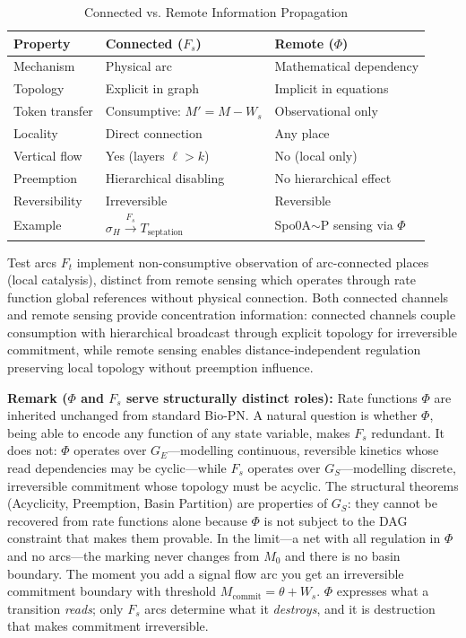 \documentclass[10pt,letterpaper]{article}
\begin{document}
\begin{table}[h]
\centering
\footnotesize
\caption{Connected vs. Remote Information Propagation}
\label{tab:connected_remote}
\begin{tabular}{p{2.2cm}p{3.9cm}p{3.9cm}}
\toprule
\textbf{Property} & \textbf{Connected ($F_s$)} & \textbf{Remote ($\Phi$)} \\
\midrule
Mechanism & Physical arc & Mathematical dependency \\
Topology & Explicit in graph & Implicit in equations \\
Token transfer & Consumptive: $M' = M - W_s$ & Observational only \\
Locality & Direct connection & Any place \\
Vertical flow & Yes (layers $\ell > k$) & No (local only) \\
Preemption & Hierarchical disabling & No hierarchical effect \\
Reversibility & Irreversible & Reversible \\
Example & $\sigma_H \xrightarrow{F_s} T_{\text{septation}}$ & Spo0A$\sim$P sensing via $\Phi$ \\
\bottomrule
\end{tabular}
\end{table}

Test arcs $F_t$ implement non-consumptive observation of arc-connected places (local catalysis), distinct from remote sensing which operates through rate function global references without physical connection. Both connected channels and remote sensing provide concentration information: connected channels couple consumption with hierarchical broadcast through explicit topology for irreversible commitment, while remote sensing enables distance-independent regulation preserving local topology without preemption influence.

\textbf{Remark ($\Phi$ and $F_s$ serve structurally distinct roles):} Rate functions $\Phi$ are inherited unchanged from standard Bio-PN. A natural question is whether $\Phi$, being able to encode any function of any state variable, makes $F_s$ redundant. It does not: $\Phi$ operates over $G_E$---modelling continuous, reversible kinetics whose read dependencies may be cyclic---while $F_s$ operates over $G_S$---modelling discrete, irreversible commitment whose topology must be acyclic. The structural theorems (Acyclicity, Preemption, Basin Partition) are properties of $G_S$: they cannot be recovered from rate functions alone because $\Phi$ is not subject to the DAG constraint that makes them provable. In the limit---a net with all regulation in $\Phi$ and no arcs---the marking never changes from $M_0$ and there is no basin boundary. The moment you add a signal flow arc you get an irreversible commitment boundary with threshold $M_{\text{commit}} = \theta + W_s$. $\Phi$ expresses what a transition \textit{reads}; only $F_s$ arcs determine what it \textit{destroys}, and it is destruction that makes commitment irreversible.
\end{document}

